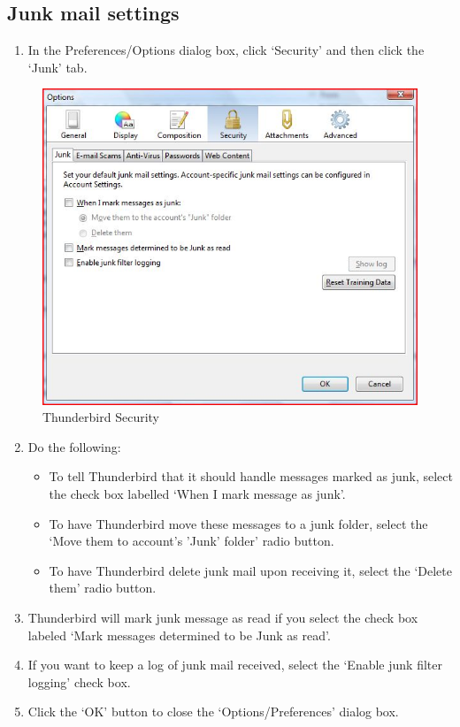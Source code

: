 \subsection{Junk mail settings}

\begin{enumerate}[1.]
\item
  In the Preferences/Options dialog box, click `Security' and then click
  the `Junk' tab.
\end{enumerate}
\begin{figure}[htbp]
\centering
\includegraphics{thunderbird_sec_1.jpg}
\caption{Thunderbird Security}
\end{figure}

\begin{enumerate}[1.]
\setcounter{enumi}{1}
\item
  Do the following:
  \begin{itemize}
  \item
    To tell Thunderbird that it should handle messages marked as junk,
    select the check box labelled `When I mark message as junk'.
  \item
    To have Thunderbird move these messages to a junk folder, select the
    `Move them to account's 'Junk' folder' radio button.
  \item
    To have Thunderbird delete junk mail upon receiving it, select the
    `Delete them' radio button.
  \end{itemize}
\item
  Thunderbird will mark junk message as read if you select the check box
  labeled `Mark messages determined to be Junk as read'.
\item
  If you want to keep a log of junk mail received, select the `Enable
  junk filter logging' check box.
\item
  Click the `OK' button to close the `Options/Preferences' dialog box.
\end{enumerate}
